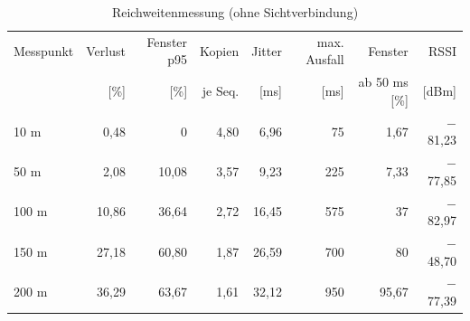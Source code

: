 \begin{table}[htbp]
  \centering
  \small
  \begin{tabular}{lrrrrrrr}
    \toprule
    Messpunkt & Verlust & Fenster p95 & Kopien & Jitter & max. Ausfall & Fenster & RSSI \\
    & [\%] & [\%] & je Seq. & [ms] & [ms] & ab 50 ms [\%] & [dBm] \\
    \midrule
    10 m & 0,48 & 0 & 4,80 & 6,96 & 75 & 1,67 & $-$81,23 \\
    50 m & 2,08 & 10,08 & 3,57 & 9,23 & 225 & 7,33 & $-$77,85 \\
    100 m & 10,86 & 36,64 & 2,72 & 16,45 & 575 & 37 & $-$82,97 \\
    150 m & 27,18 & 60,80 & 1,87 & 26,59 & 700 & 80 & $-$48,70 \\
    200 m & 36,29 & 63,67 & 1,61 & 32,12 & 950 & 95,67 & $-$77,39 \\
    \bottomrule
\end{tabular}
\caption{Reichweitenmessung (ohne Sichtverbindung)}
  \label{tab:range-hidden-summary}
\end{table}
